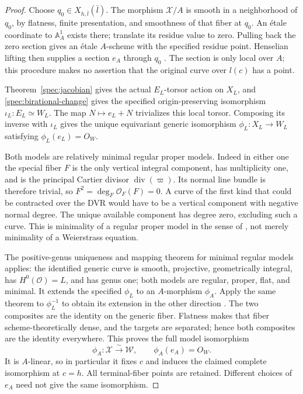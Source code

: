\begin{proof}
Choose $q_0\in X_{h,\bar l}(\bar l)$.  The morphism $\mathcal X/A$
is smooth in a neighborhood of $q_0$, by flatness, finite
presentation, and smoothness of that fiber at $q_0$.  An \'{e}tale
coordinate to $\mathbb A^1_A$ exists there; translate its residue
value to zero.  Pulling back the zero section gives an \'{e}tale
$A$-scheme with the specified residue point.  Henselian lifting
then supplies a section $e_A$ through $q_0$
\cite[Tag 04GG, Lemma 10.153.3(8)]{StacksProject2026}.  The section is only local over
$A$; this procedure makes no assertion that the original curve over
$l(c)$ has a point.

Theorem~\ref{spec:jacobian} gives the actual $E_L$-torsor action on
$X_L$, and \eqref{spec:birational-change} gives the specified
origin-preserving isomorphism $\iota_L:E_L\simeq W_L$.
The map $N\mapsto e_L+N$ trivializes this local torsor.  Composing
its inverse with $\iota_L$ gives the unique equivariant generic
isomorphism $\phi_L:X_L\to W_L$ satisfying
$\phi_L(e_L)=O_W$.

Both models are relatively minimal regular proper models.  Indeed
in either one the special fiber $F$ is the only vertical integral
component, has multiplicity one, and is the principal Cartier
divisor $\operatorname{div}(\varpi)$.  Its normal line bundle is
therefore trivial, so $F^2=\deg_F\mathcal O_F(F)=0$.
A curve of the first kind that could be contracted over the DVR
would have to be a vertical component with negative normal degree.
The unique available component has degree zero, excluding such a
curve.  This is minimality of a regular proper model in the sense of
\cite[Definition 55.8.4, Tag 0C2V]{StacksProject2026}, not merely
minimality of a Weierstrass equation.

The positive-genus uniqueness and mapping theorem for minimal
regular models applies: the identified generic curve is smooth,
projective, geometrically integral, has $H^0(\mathcal O)=L$, and
has genus one; both models are regular, proper, flat, and minimal.
It extends the specified $\phi_L$ to an $A$-morphism $\phi_A$.
Apply the same theorem to $\phi_L^{-1}$ to obtain its extension in
the other direction
\cite[Lemmas 55.10.1--55.10.2, Tags 0C6B and 0C9Z]{StacksProject2026}.
The two composites are the identity on the generic fiber.  Flatness
makes that fiber scheme-theoretically dense, and the targets are
separated; hence both composites are the identity everywhere.
This proves the full model isomorphism
\begin{equation}
\phi_A:\mathcal X\xrightarrow{\sim}\mathcal W,
\qquad \phi_A(e_A)=O_W.
\label{hasse:complete-model-isomorphism}
\end{equation}
It is $A$-linear, so in particular it fixes $c$ and induces the
claimed complete isomorphism at $c=h$.  All terminal-fiber points
are retained.  Different choices of $e_A$ need not give the same
isomorphism.


\end{proof}
